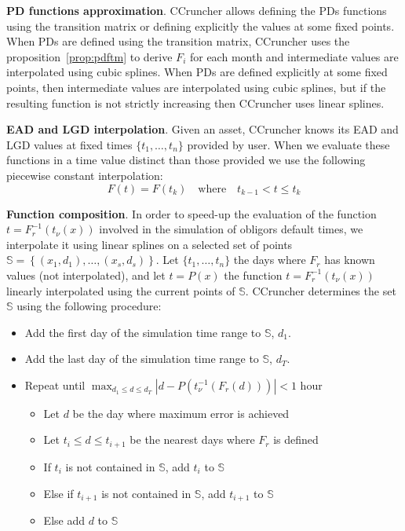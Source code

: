 \documentclass[11pt,fleqn]{book} %
\begin{document}
\textbf{PD functions approximation}. CCruncher allows defining the PDs
functions using the transition matrix or defining explicitly the values
at some fixed points. When PDs are defined using the transition matrix, 
CCruncher uses the proposition~\ref{prop:pdftm} to derive $F_i$ for each 
month and intermediate values are interpolated using cubic splines. 
When PDs are defined explicitly at some fixed points, then intermediate 
values are interpolated using cubic splines, but if the resulting function 
is not strictly increasing then CCruncher uses linear splines.

\textbf{EAD and LGD interpolation}. Given an asset, CCruncher knows its EAD 
and LGD values at fixed times $\{t_1,\dots,t_n\}$ provided by user. When 
we evaluate these functions in a time value distinct than those provided we 
use the following piecewise constant interpolation:
\begin{displaymath}
	F(t) = F(t_k) \quad \text{where} \quad t_{k-1} < t \le t_{k}
\end{displaymath}

\textbf{Function composition}. In order to speed-up the evaluation of the
function $t=F_r^{-1}(t_{\nu}(x))$ involved in the simulation of obligors 
default times, we interpolate it using linear splines on a selected set of 
points $\mathbb{S} = \left\{(x_1,d_1),\dots,(x_s,d_s)\right\}$. 
Let $\{t_1,\dots,t_n\}$ the days where $F_r$ has known values (not 
interpolated), and let $t=P(x)$ the function $t=F_r^{-1}(t_{\nu}(x))$ 
linearly interpolated using the current points of $\mathbb{S}$. 
CCruncher determines the set $\mathbb{S}$ using the following procedure:
\begin{itemize}
	\item Add the first day of the simulation time range to $\mathbb{S}$, $d_1$.
	\item Add the last day of the simulation time range to $\mathbb{S}$, $d_T$.
	\item Repeat until $\displaystyle \max_{d_1 \le d \le d_T}\left|d - P(t_{\nu}^{-1}(F_r(d)))\right| < 1$ hour
	\begin{itemize}
		\item Let $d$ be the day where maximum error is achieved
		\item Let $t_i \le d \le t_{i+1}$ be the nearest days where $F_r$ is defined
		\item If $t_i$ is not contained in $\mathbb{S}$, add $t_i$ to $\mathbb{S}$
		\item Else if $t_{i+1}$ is not contained in $\mathbb{S}$, add $t_{i+1}$ to $\mathbb{S}$
		\item Else add $d$ to $\mathbb{S}$
	\end{itemize}
\end{itemize}
\end{document}
